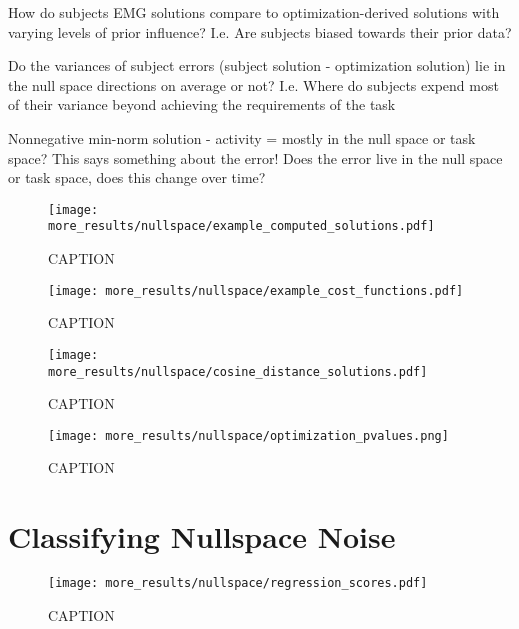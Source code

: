 \documentclass[../main.tex]{subfiles}
\begin{document}
How do subjects EMG solutions compare to optimization-derived solutions with varying levels of prior influence? I.e. Are subjects biased towards their prior data?

Do the variances of subject errors (subject solution - optimization solution) lie in the null space directions on average or not? I.e. Where do subjects expend most of their variance beyond achieving the requirements of the task 

Nonnegative min-norm solution - activity = mostly in the null space or task space? This says something about the error! Does the error live in the null space or task space, does this change over time?

\begin{figure}[tph]
  \centering
    \texttt{[image: more\_results/nullspace/example\_computed\_solutions.pdf]}
    \caption[Computed solutions]{CAPTION}\label{fig:computed_solutions}
\end{figure}

\begin{figure}[tph]
  \centering
    \texttt{[image: more\_results/nullspace/example\_cost\_functions.pdf]}
    \caption[Example Cost Functions for Optimal Solutions]{CAPTION}\label{fig:cost_functions}
\end{figure}

\begin{figure}[tph]
  \centering
    \texttt{[image: more\_results/nullspace/cosine\_distance\_solutions.pdf]}
    \caption[Distance from computed solutions]{CAPTION}\label{fig:computed_distances}
\end{figure}

\begin{figure}[tph]
  \centering
    \texttt{[image: more\_results/nullspace/optimization\_pvalues.png]}
    \caption[Significance matrix for optimization solutions]{CAPTION}\label{fig:optimization_pvalues}
\end{figure}




\section{Classifying Nullspace Noise}


\begin{figure}[tph]
  \centering
    \texttt{[image: more\_results/nullspace/regression\_scores.pdf]}
    \caption[regression scores]{CAPTION}\label{fig:regression_scores}
\end{figure}
\end{document}

